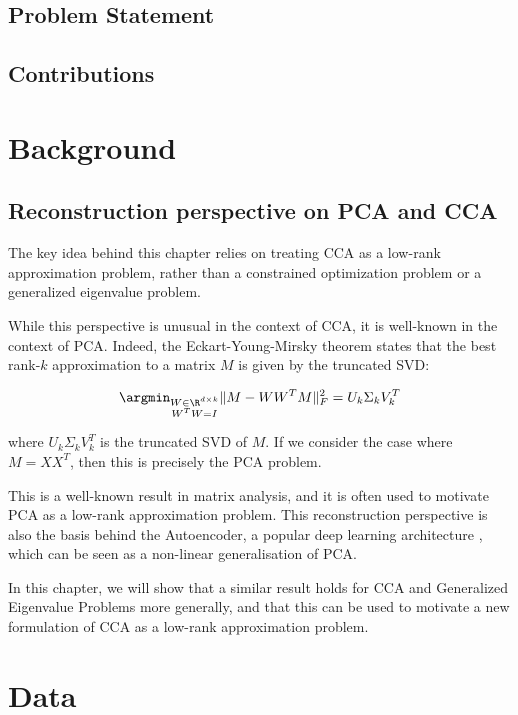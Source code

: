 \subsection{Problem Statement}

\subsection{Contributions}



\section{Background}
\subsection{Reconstruction perspective on PCA and CCA}
The key idea behind this chapter relies on treating CCA as a low-rank approximation problem, rather than a constrained optimization problem or a generalized eigenvalue problem.

While this perspective is unusual in the context of CCA, it is well-known in the context of PCA. Indeed, the Eckart-Young-Mirsky theorem \cite{stewart_matrix_1990} states that the best rank-$k$ approximation to a matrix $M$ is given by the truncated SVD:

\begin{align}
    \argmin_{\substack{W \in \R^{d \times k} \\ W^T W = I}} \| M - W W^T M \|_F^2 = U_k \Sigma_k V_k^T
\end{align}

where $U_k \Sigma_k V_k^T$ is the truncated SVD of $M$. If we consider the case where $M=XX^T$, then this is precisely the PCA problem. 

This is a well-known result in matrix analysis, and it is often used to motivate PCA as a low-rank approximation problem. 
This reconstruction perspective is also the basis behind the Autoencoder, a popular deep learning architecture \cite{goodfellow2016deep}, which can be seen as a non-linear generalisation of PCA. 

In this chapter, we will show that a similar result holds for CCA and Generalized Eigenvalue Problems more generally, and that this can be used to motivate a new formulation of CCA as a low-rank approximation problem.

\section{Data}
